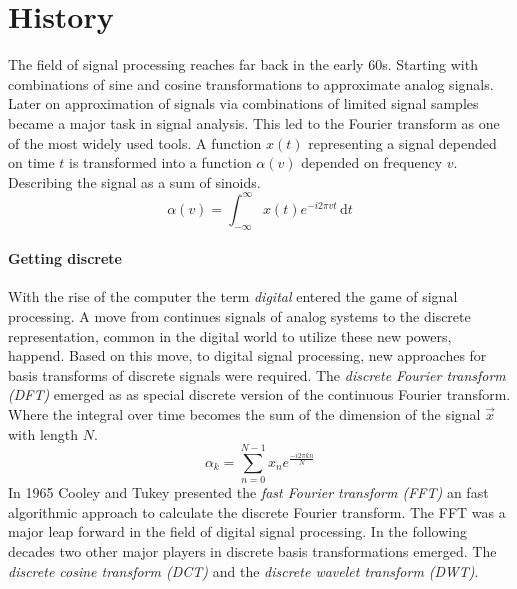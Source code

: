 \section{History}
\label{sec:history}
The field of signal processing reaches far back in the early 60s.
Starting with combinations of sine and cosine transformations to approximate
analog signals. 
Later on approximation of signals via combinations of limited signal samples
became a major task in signal analysis. This led to the Fourier transform as one
of the most widely used tools. A function $x(t)$ representing a signal depended
on time $t$ is transformed into a function   $\alpha(v)$  depended on frequency
$v$. Describing the signal as a sum of sinoids. 
\begin{equation*}
\alpha\left(v\right) = \int_{-\infty}^{\infty} \! x(t)e^{-i2\pi
v t} \,
\mathrm{d}t
\end{equation*}

\paragraph{Getting discrete}
With the rise of the computer the term \emph{digital} entered the
game of signal processing. A move from continues signals of analog systems to
the discrete representation, common in the digital world to utilize these new
powers, happend. Based on this move, to digital signal processing, new
approaches for basis transforms of discrete signals were required. The
\emph{discrete Fourier transform (DFT)} emerged as as special discrete version
of the continuous
Fourier transform. Where the integral over time becomes the sum of the dimension
of the signal $\vec{x}$ with length $N$. 
\begin{equation}
 \alpha_k = \sum_{n=0}^{N-1}x_ne^{\frac{-i2\pi kn}{N}}
\end{equation}
In 1965 Cooley and Tukey presented\cite{Cooley1965} the \emph{fast Fourier
transform (FFT)} an fast algorithmic approach to calculate the discrete
Fourier transform. The FFT was a major leap forward in the field of digital
signal processing. 
In the following decades two other major players in discrete basis
transformations emerged. The \emph{discrete cosine transform (DCT)} and the
\emph{discrete wavelet transform (DWT)}. 

